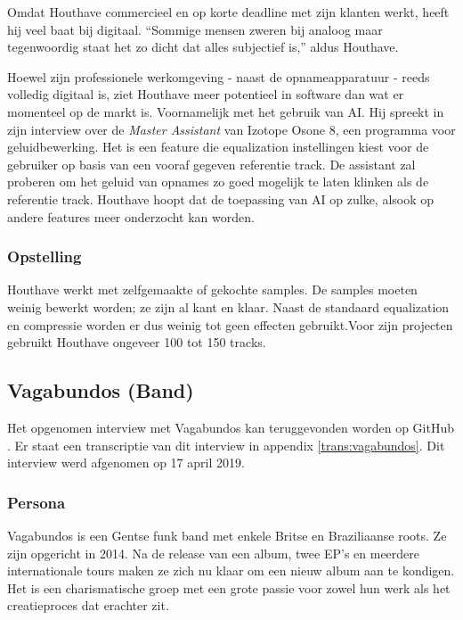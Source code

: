 Omdat Houthave commercieel en op korte deadline met zijn klanten werkt, heeft hij veel baat bij digitaal. ``Sommige mensen zweren bij analoog maar tegenwoordig staat het zo dicht dat alles subjectief is,'' aldus Houthave. \autocite{thomashouthave} 

Hoewel zijn professionele werkomgeving - naast de opnameapparatuur - reeds volledig digitaal is, ziet Houthave meer potentieel in software dan wat er momenteel op de markt is. Voornamelijk met het gebruik van AI. Hij spreekt in zijn interview over de \textit{Master Assistant} van Izotope Osone 8, een programma voor geluidbewerking. Het is een feature die equalization instellingen kiest voor de gebruiker op basis van een vooraf gegeven referentie track. De assistant zal proberen om het geluid van opnames zo goed mogelijk te laten klinken als de referentie track. Houthave hoopt dat de toepassing van AI op zulke, alsook op andere features meer onderzocht kan worden. \autocite{thomashouthave}

\subsubsection*{Opstelling}

Houthave werkt met zelfgemaakte of gekochte samples. De samples moeten weinig bewerkt worden; ze zijn al kant en klaar. Naast de standaard equalization en compressie worden er dus weinig tot geen effecten gebruikt.\newline Voor zijn projecten gebruikt Houthave ongeveer 100 tot 150 tracks. \autocite{thomashouthave}

\subsection{Vagabundos (Band)}

Het opgenomen interview met Vagabundos kan teruggevonden worden op GitHub \autocite{vagabundos}. Er staat een transcriptie van dit interview in appendix \ref{trans:vagabundos}. Dit interview werd afgenomen op 17 april 2019.

\subsubsection*{Persona}

Vagabundos is een Gentse funk band met enkele Britse en Braziliaanse roots. Ze zijn opgericht in 2014. Na de release van een album, twee EP's en meerdere internationale tours maken ze zich nu klaar om een nieuw album aan te kondigen. Het is een charismatische groep met een grote passie voor zowel hun werk als het creatieproces dat erachter zit. \autocite{vagabio}

